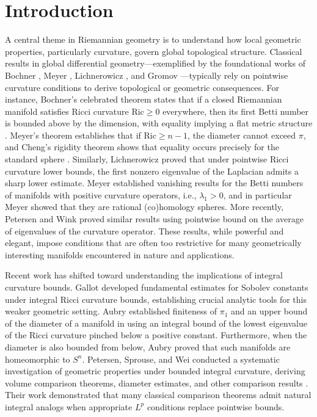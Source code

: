 \documentclass[12pt, twoside]{article}
\theoremstyle{definition}
\numberwithin{equation}{section}
\def \la {\lambda}
\begin{document}
	
	\section{Introduction}
A central theme in Riemannian geometry is to understand how local geometric properties, particularly curvature, govern global topological structure. Classical results in global differential geometry---exemplified by the foundational works of Bochner \cite{Bochner1946}, Meyer \cite{Meyer1971}, Lichnerowicz \cite{Lichnerowicz1977}, and Gromov \cite{Gromov1978,Gromov1981}---typically rely on pointwise curvature conditions to derive topological or geometric consequences. For instance, Bochner's celebrated theorem states that if a closed Riemannian manifold satisfies Ricci curvature $\mathrm{Ric} \geq 0$ everywhere, then its first Betti number is bounded above by the dimension, with equality implying a flat metric structure \cite{Bochner1946}. Meyer's theorem  establishes that if $\mathrm{Ric} \geq n-1$, the diameter cannot exceed $\pi$, and Cheng's rigidity theorem shows that equality occurs precisely for the standard sphere \cite{Cheng1975}. Similarly, Lichnerowicz proved that under pointwise Ricci curvature lower bounds, the first nonzero eigenvalue of the Laplacian admits a sharp lower estimate. Meyer \cite{Meyer1971} established vanishing results for the Betti numbers of manifolds with positive curvature operators, i.e., $\la_{1}>0$, and in particular Meyer showed that they are rational (co)homology spheres.  More recently, Petersen and Wink \cite{Petersen2021} proved similar results using pointwise bound on the average of eigenvalues of the curvature operator. These results, while powerful and elegant, impose conditions that are often too restrictive for many geometrically interesting manifolds encountered in nature and applications. 

Recent work has shifted toward understanding the implications of integral curvature bounds. Gallot \cite{Gallot1981,Gallot1988} developed fundamental estimates for Sobolev constants under integral Ricci curvature bounds, establishing crucial analytic tools for this weaker geometric setting. Aubry established finiteness of $\pi_{1}$ and an upper bound of the diameter of a manifold in \cite{Aubry2007} using an integral bound of the lowest eigenvalue of the Ricci curvature pinched below a positive constant. Furthermore, when the diameter is also bounded from below, Aubry \cite{Aubry2009} proved that such manifolds are homeomorphic to $S^{n}$. Petersen, Sprouse, and Wei conducted a systematic investigation of geometric properties under bounded integral curvature, deriving volume comparison theorems, diameter estimates, and other comparison results \cite{Petersen1997a,Petersen1997b,Petersen1998}. Their work demonstrated that many classical comparison theorems admit natural integral analogs when appropriate $L^p$ conditions replace pointwise bounds. 
\end{document}
